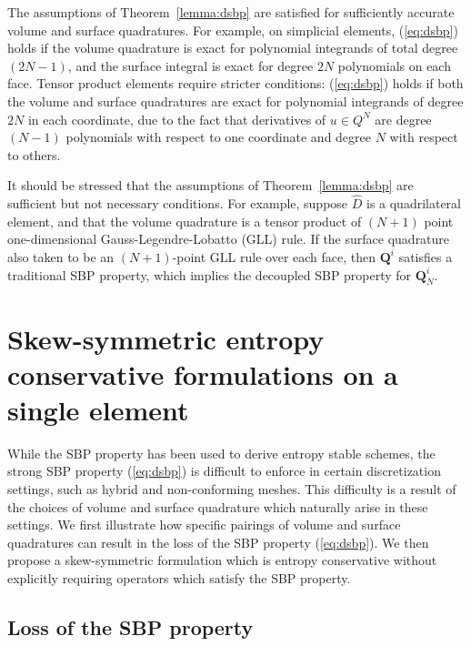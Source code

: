 \documentclass{svjour3}                     %
\renewcommand{\hat}{\widehat}
\begin{document}
The assumptions of Theorem~\ref{lemma:dsbp} are satisfied for sufficiently accurate volume and surface quadratures.  For example, on simplicial elements, (\ref{eq:dsbp}) holds if the volume quadrature is exact for polynomial integrands of total degree $(2N-1)$, and the surface integral is exact for degree $2N$ polynomials on each face.  Tensor product elements require stricter conditions: (\ref{eq:dsbp}) holds if both the volume and surface quadratures are exact for polynomial integrands of degree $2N$ in each coordinate, due to the fact that derivatives of $u\in Q^N$ are degree $(N-1)$ polynomials with respect to one coordinate and degree $N$ with respect to others.  

\begin{remark}
It should be stressed that the assumptions of Theorem~\ref{lemma:dsbp} are sufficient but not necessary conditions.  For example, suppose $\hat{D}$ is a quadrilateral element, and that the volume quadrature is a tensor product of $(N+1)$ point one-dimensional Gauss-Legendre-Lobatto (GLL) rule.  If the surface quadrature also taken to be an $(N+1)$-point GLL rule over each face, then $\bm{Q}^i$ satisfies a traditional SBP property, which implies the decoupled SBP property for $\bm{Q}^i_N$.  
\end{remark}

\section{Skew-symmetric entropy conservative formulations on a single element}
\label{sec:skew1}
While the SBP property has been used to derive entropy stable schemes, the strong SBP property (\ref{eq:dsbp}) is difficult to enforce in certain discretization settings, such as hybrid and non-conforming meshes.  This difficulty is a result of the choices of volume and surface quadrature which naturally arise in these settings.  We first illustrate how specific pairings of volume and surface quadratures can result in the loss of the SBP property (\ref{eq:dsbp}).  We then propose a skew-symmetric formulation which is entropy conservative without explicitly requiring operators which satisfy the SBP property.  

\subsection{Loss of the SBP property}
\end{document}
